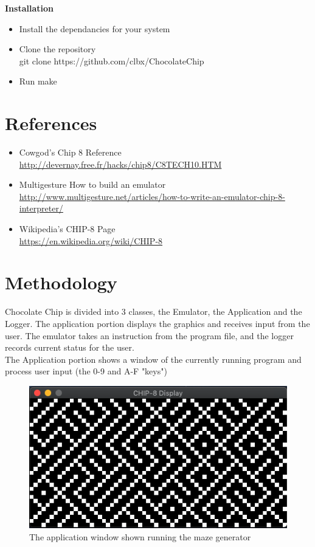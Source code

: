 \documentclass[12pt]{IEEEtran}
\begin{document}
\textbf{Installation}


\begin{itemize}
    \item Install the dependancies for your system
    \item Clone the repository\\ 
    \colorbox{gray!30}{git clone https://github.com/clbx/ChocolateChip}
    \item Run \colorbox{gray!30}{make}
\end{itemize}

\section{References}
\begin{itemize}
    \item Cowgod's Chip 8 Reference\\ \href{http://devernay.free.fr/hacks/chip8/C8TECH10.HTM}{http://devernay.free.fr/hacks/chip8/C8TECH10.HTM}
    \item Multigesture How to build an emulator\\ \href{http://www.multigesture.net/articles/how-to-write-an-emulator-chip-8-interpreter/}{http://www.multigesture.net/articles/how-to-write-an-emulator-chip-8-interpreter/}
    \item Wikipedia's CHIP-8 Page\\ \href{https://en.wikipedia.org/wiki/CHIP-8}{https://en.wikipedia.org/wiki/CHIP-8}
\end{itemize}

\section{Methodology}
Chocolate Chip is divided into 3 classes, the Emulator, the Application and the Logger.
The application portion displays the graphics and receives input from the user. The emulator takes an instruction from the program file, and the logger records current status for the user.
\\
The Application portion shows a window of the currently running program and process user input (the 0-9 and A-F "keys")
\begin{figure}[h]
    \includegraphics[width=\linewidth]{application.png}
    \caption{The application window shown running the maze generator}
\end{figure}
\end{document}
